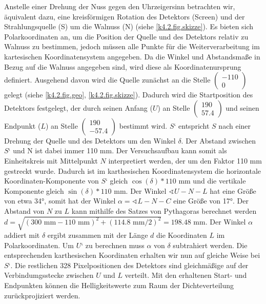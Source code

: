 Anstelle einer Drehung der Nuss gegen den Uhrzeigersinn betrachten wir, äquivalent dazu, eine kreisförmigen Rotation des Detektors (Screen) und der Strahlungsquelle (S) um die Walnuss (N) (siehe \cref{k4.2.fig.skizze}). Es bieten sich Polarkoordinaten an, um die Position der Quelle und des Detektors relativ zu Walnuss zu bestimmen, jedoch müssen alle Punkte für die Weiterverarbeitung im kartesischen Koordinatensystem angegeben. Da die Winkel und Abstandsmaße in Bezug auf die Walnuss angegeben sind, wird diese als Koordinatenursprung definiert. Ausgehend davon wird die Quelle zunächst an die Stelle $\begin{pmatrix}-110\\ 0 \end{pmatrix}$   gelegt (siehe \cref{k4.2.fig.geo}, \cref{k4.2.fig.skizze}). Dadurch wird die Startposition des Detektors festgelegt, der durch seinen Anfang ($U$) an Stelle $\begin{pmatrix}190\\ 57.4 \end{pmatrix}$ und seinen Endpunkt ($L$) an Stelle $\begin{pmatrix}190\\ -57.4 \end{pmatrix}$ bestimmt wird. 
$S‘$ entspricht $S$ nach einer Drehung der Quelle und des Detektors um den Winkel $\delta$. Der Abstand zwischen $S‘$ und $\mathrm{N}$ ist dabei immer 110 mm. Der Versuchsaufbau kann somit als Einheitskreis mit Mittelpunkt $N$ interpretiert werden, der um den Faktor 110 mm gestreckt wurde. Dadurch ist im karthesischen Koordinatensystem die horizontale Koordinaten-Komponente von $S‘$ gleich $\cos(\delta) * 110\text{ mm}$ und die vertikale Komponente gleich $\sin(\delta) * 110\text{ mm}$.
Der Winkel $\sphericalangle U-N-L$ hat eine Größe von etwa 34°, somit hat der Winkel $\alpha = \sphericalangle L-N-C$ eine Größe von 17°. Der Abstand von $N$ zu $L$ kann mithilfe des Satzes von Pythagoras berechnet werden $d = \sqrt{(300\text{ mm} - 110\text{ mm})^2+(114.8\text{ mm}/2)^2} = 198.48\text{ mm}$.
Der Winkel $\alpha$ addiert mit $\delta$ ergibt zusammen mit der Länge $d$ die Koordinaten $L$ im Polarkoordinaten. Um $U‘$ zu berechnen muss $\alpha$ von $\delta$ subtrahiert werden. Die entsprechenden karthesischen Koordinaten erhalten wir nun auf gleiche Weise bei $S‘$. Die restlichen 328 Pixelpositionen des Detektors sind gleichmäßige auf der Verbindumgsstecke zwischen $U$ und $L$ verteilt.
Mit den erhaltenen Start- und Endpunkten können die Helligkeitswerte zum Raum der Dichteverteilung zurückprojiziert werden.
